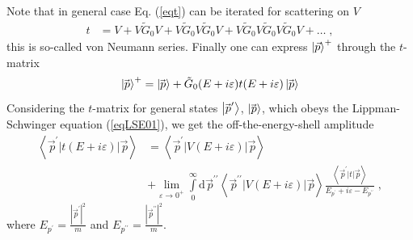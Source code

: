 Note that in general case Eq. (\ref{eqt}) can be iterated for scattering on $V$ 
\begin{equation}
\begin{split} 
t &= V + V\tilde{G}_{0}V + V\tilde{G}_{0}V\tilde{G}_{0}V + V\tilde{G}_{0}V\tilde{G}_{0}V\tilde{G}_{0}V + \ldots\;,
\end{split}
\end{equation}
this is so-called von Neumann series. Finally one can express $\ket{\vec{p}}^{+}$ through the $t$-matrix
\begin{equation}
\ket{\!\vec{\,p}}^{+} = \ket{\!\vec{\,p}} + \tilde{G}_{0}(E + i\varepsilon)t(E + i\varepsilon)\ket{\!\vec{\,p}}
\end{equation}
%
Considering the $t$-matrix for general states $\ket{\!\vec{\,p}^{\prime}}$, $\ket{\!\vec{\,p}}$, which obeys the Lippman-Schwinger equation (\ref{eqLSE01}), we get the off-the-energy-shell amplitude~\cite{glockle1983quantum}
\begin{equation}
\begin{split}
\left<\!\vec{\,p}^{\prime}|t(E + i\varepsilon)|\!\vec{\,p}\right> &= 
\left<\!\vec{\,p}^{\prime}|V(E + i\varepsilon)|\!\vec{\,p}\right> \\
&+\lim\limits_{\varepsilon \rightarrow 0^{+}}\int\limits_{0}^{\infty}\mathrm{d}\!\vec{\,p}^{\prime\prime}\left<\!\vec{\,p}^{\prime\prime}|V(E + i\varepsilon)|\!\vec{\,p}\right>\frac{\left<\!\vec{\,p}^{\prime}|t|\!\vec{\,p}\right>}{E_{p^{\prime}} + i\varepsilon - E_{p^{\prime\prime}}}\;,
\end{split}
\label{Eqtmain}
\end{equation}
where $E_{p^{\prime}} = \frac{|\!\vec{\,p}^{\prime}|^{2}}{m}$ and $E_{p^{\prime\prime}} = \frac{|\!\vec{\,p}^{\prime\prime}|^{2}}{m}$. 
